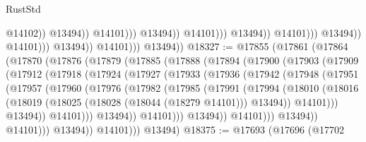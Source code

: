\begin{lexlean}{RustStd}
\begin{coremodule}
                                                              @14102))
                                                          @13494))
                                                      @14101)))
                                                @13494))
                                            @14101)))
                                      @13494))
                                  @14101)))
                            @13494))
                        @14101)))
                  @13494))
              @14101)))
        @13494))
@18327 := @17855
    (@17861
      (@17864
        (@17870
          (@17876
            (@17879
              (@17885
                (@17888
                  (@17894
                    (@17900
                      (@17903
                        (@17909
                          (@17912
                            (@17918
                              (@17924
                                (@17927
                                  (@17933
                                    (@17936
                                      (@17942
                                        (@17948
                                          (@17951
                                            (@17957
                                              (@17960
                                                (@17976
                                                  (@17982
                                                    (@17985
                                                      (@17991
                                                        (@17994
                                                          (@18010
                                                            (@18016
                                                              (@18019
                                                                (@18025
                                                                  (@18028 (@18044 (@18279 @14101)))
                                                                  @13494))
                                                              @14101)))
                                                        @13494))
                                                    @14101)))
                                              @13494))
                                          @14101)))
                                    @13494))
                                @14101)))
                          @13494))
                      @14101)))
                @13494))
            @14101)))
      @13494)
@18375 := @17693
    (@17696
      (@17702

\end{coremodule}
\end{lexlean}
